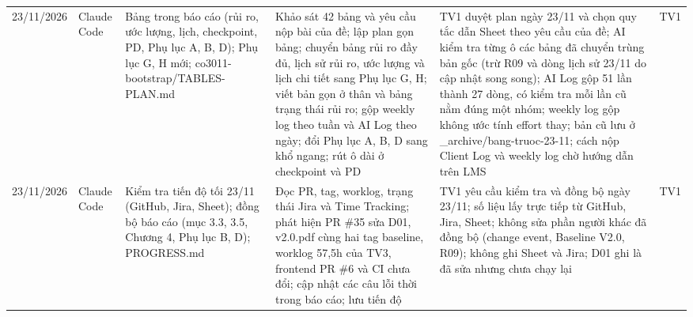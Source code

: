 \begin{landscape}
\begin{longtable}{L{1.90cm}L{1.47cm}L{4.33cm}L{5.54cm}L{4.93cm}L{1.30cm}}
23/11/2026 & Claude Code & Bảng trong báo cáo (rủi ro, ước lượng, lịch, checkpoint, PD, Phụ lục A, B, D); Phụ lục G, H mới; co3011-bootstrap/TABLES-PLAN.md & Khảo sát 42 bảng và yêu cầu nộp bài của đề; lập plan gọn bảng; chuyển bảng rủi ro đầy đủ, lịch sử rủi ro, ước lượng và lịch chi tiết sang Phụ lục G, H; viết bản gọn ở thân và bảng trạng thái rủi ro; gộp weekly log theo tuần và AI Log theo ngày; đổi Phụ lục A, B, D sang khổ ngang; rút ô dài ở checkpoint và PD & TV1 duyệt plan ngày 23/11 và chọn quy tắc dẫn Sheet theo yêu cầu của đề; AI kiểm tra từng ô các bảng đã chuyển trùng bản gốc (trừ R09 và dòng lịch sử 23/11 do cập nhật song song); AI Log gộp 51 lần thành 27 dòng, có kiểm tra mỗi lần cũ nằm đúng một nhóm; weekly log gộp không ước tính effort thay; bản cũ lưu ở \_archive/bang-truoc-23-11; cách nộp Client Log và weekly log chờ hướng dẫn trên LMS & TV1 \\
23/11/2026 & Claude Code & Kiểm tra tiến độ tối 23/11 (GitHub, Jira, Sheet); đồng bộ báo cáo (mục 3.3, 3.5, Chương 4, Phụ lục B, D); PROGRESS.md & Đọc PR, tag, worklog, trạng thái Jira và Time Tracking; phát hiện PR \#35 sửa D01, v2.0.pdf cùng hai tag baseline, worklog 57,5h của TV3, frontend PR \#6 và CI chưa đổi; cập nhật các câu lỗi thời trong báo cáo; lưu tiến độ & TV1 yêu cầu kiểm tra và đồng bộ ngày 23/11; số liệu lấy trực tiếp từ GitHub, Jira, Sheet; không sửa phần người khác đã đồng bộ (change event, Baseline V2.0, R09); không ghi Sheet và Jira; D01 ghi là đã sửa nhưng chưa chạy lại & TV1 \\

\end{longtable}
\end{landscape}
